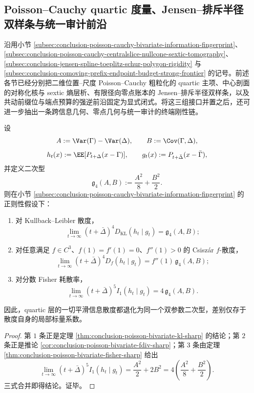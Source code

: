 \subsection{Poisson--Cauchy quartic 度量、Jensen--排斥半径双样条与统一审计前沿}\label{subsec:conclusion-poisson-cauchy-jensen-audit-affine-rigidity}

沿用小节 \ref{subsec:conclusion-poisson-cauchy-bivariate-information-fingerprint}、\ref{subsec:conclusion-poisson-cauchy-centralslice-nullcone-sextic-tomography}、\ref{subsec:conclusion-jensen-spline-toeplitz-schur-polygon-rigidity} 与 \ref{subsec:conclusion-comoving-prefix-endpoint-budget-strong-frontier} 的记号。前述各节已经分别把二维位置--尺度 Poisson--Cauchy 粗粒化的 quartic 主项、中心剖面的对称化核与 sextic 熵层析、有限径向零点账本的 Jensen--排斥半径双样条，以及共动前缀位与端点预算的强逆前沿固定为显式闭式。将这三组接口并置之后，还可进一步抽出一条跨信息几何、零点几何与统一审计的终端刚性链。

\begin{theorem}\label{thm:conclusion-poisson-cauchy-universal-quartic-information-metric}
设
\[
A:=\Var(\Gamma)-\Var(\Delta),
\qquad
B:=\Cov(\Gamma,\Delta),
\]
\[
h_t(x):=\EE[P_{t+\Delta}(x-\Gamma)],
\qquad
g_t(x):=P_{t+\bar\Delta}(x-\bar\Gamma),
\]
并定义二次型
\[
\mathfrak g_4(A,B):=\frac{A^2}{8}+\frac{B^2}{2}.
\]
则在小节 \ref{subsec:conclusion-poisson-cauchy-bivariate-information-fingerprint} 的正则性假设下：
\begin{enumerate}
  \item 对 Kullback--Leibler 散度，
  \[
  \lim_{t\to\infty}(t+\bar\Delta)^4D_{\mathrm{KL}}(h_t\mid g_t)=\mathfrak g_4(A,B);
  \]
  \item 对任意满足 \(f\in C^3\)、\(f(1)=f'(1)=0\)、\(f''(1)>0\) 的 Csisz\'ar \(f\)-散度，
  \[
  \lim_{t\to\infty}(t+\bar\Delta)^4D_f(h_t\mid g_t)=f''(1)\,\mathfrak g_4(A,B);
  \]
  \item 对分数 Fisher 耗散率，
  \[
  \lim_{t\to\infty}(t+\bar\Delta)^5I_1(h_t\mid g_t)=4\,\mathfrak g_4(A,B).
  \]
\end{enumerate}
因此，quartic 层的一切平滑信息散度都退化为同一个双参数二次型，差别仅存于散度自身的局部标量系数。
\end{theorem}
\begin{proof}
第 \(1\) 条正是定理 \ref{thm:conclusion-poisson-bivariate-kl-sharp} 的结论；第 \(2\) 条正是推论 \ref{cor:conclusion-poisson-bivariate-fdiv-sharp}；第 \(3\) 条由定理 \ref{thm:conclusion-poisson-bivariate-fisher-sharp} 给出
\[
\lim_{t\to\infty}(t+\bar\Delta)^5I_1(h_t\mid g_t)=\frac{A^2}{2}+2B^2
=4\left(\frac{A^2}{8}+\frac{B^2}{2}\right).
\]
三式合并即得结论。证毕。
\end{proof}

